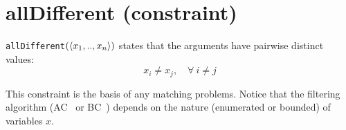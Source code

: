 \label{alldifferent}
\hypertarget{alldifferent}{}

\section{allDifferent (constraint)}\label{alldifferent:alldifferentconstraint}\hypertarget{alldifferent:alldifferentconstraint}{}
\begin{notedef}
  \texttt{allDifferent}$(\langle x_1,..,x_n\rangle)$ states that the arguments have pairwise distinct values:
 $$x_i \neq x_j,\quad \forall\ i\neq j$$  
\end{notedef}
This constraint is the basis of any matching problems.
Notice that the filtering algorithm (AC~\cite{ReginAAAI94} or BC~\cite{LopezIJCAI03}) depends on the nature (enumerated or bounded) of variables $x$. 

